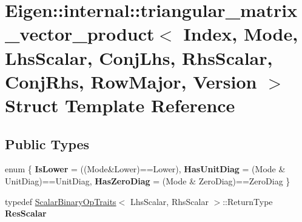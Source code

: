 \hypertarget{struct_eigen_1_1internal_1_1triangular__matrix__vector__product_3_01_index_00_01_mode_00_01_lhs_ba3b9cdc80cdaeff44c1d1ed32cbe15b}{}\section{Eigen\+::internal\+::triangular\+\_\+matrix\+\_\+vector\+\_\+product$<$ Index, Mode, Lhs\+Scalar, Conj\+Lhs, Rhs\+Scalar, Conj\+Rhs, Row\+Major, Version $>$ Struct Template Reference}
\label{struct_eigen_1_1internal_1_1triangular__matrix__vector__product_3_01_index_00_01_mode_00_01_lhs_ba3b9cdc80cdaeff44c1d1ed32cbe15b}
\subsection*{Public Types}
\begin{DoxyCompactItemize}
\item 
\mbox{\label{struct_eigen_1_1internal_1_1triangular__matrix__vector__product_3_01_index_00_01_mode_00_01_lhs_ba3b9cdc80cdaeff44c1d1ed32cbe15b_a5711d2ba5a960740e4a114179c780b7b}} 
enum \{ {\bfseries Is\+Lower} = ((Mode\&Lower)==Lower), 
{\bfseries Has\+Unit\+Diag} = (Mode \& Unit\+Diag)==Unit\+Diag, 
{\bfseries Has\+Zero\+Diag} = (Mode \& Zero\+Diag)==Zero\+Diag
 \}
\item 
\mbox{\label{struct_eigen_1_1internal_1_1triangular__matrix__vector__product_3_01_index_00_01_mode_00_01_lhs_ba3b9cdc80cdaeff44c1d1ed32cbe15b_ad300449c5f5b7d98e3633469ff77b96c}} 
typedef \mbox{\hyperlink{struct_eigen_1_1_scalar_binary_op_traits}{Scalar\+Binary\+Op\+Traits}}$<$ Lhs\+Scalar, Rhs\+Scalar $>$\+::Return\+Type {\bfseries Res\+Scalar}
\end{DoxyCompactItemize}
